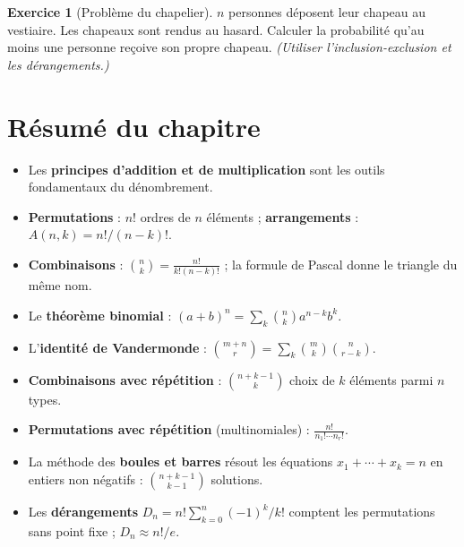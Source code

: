 \documentclass[12pt,a4paper,openany]{book}
\theoremstyle{definition}
\newtheorem{exercice}{Exercice}[chapter]
\theoremstyle{plain}
\theoremstyle{remark}
\begin{document}
\begin{exercice}[Problème du chapelier]\label{exo:chapelier}
$n$ personnes déposent leur chapeau au vestiaire. Les chapeaux sont rendus
au hasard. Calculer la probabilité qu'au moins une personne reçoive son propre
chapeau. \textit{(Utiliser l'inclusion-exclusion et les dérangements.)}
\end{exercice}

\section*{Résumé du chapitre~\thechapter}\label{sec:resume-ch4}

\begin{itemize}
  \item Les \textbf{principes d'addition et de multiplication} sont les outils
    fondamentaux du dénombrement.
  \item \textbf{Permutations} : $n!$ ordres de $n$ éléments ;
    \textbf{arrangements} : $A(n,k) = n!/(n-k)!$.
  \item \textbf{Combinaisons} : $\binom{n}{k} = \frac{n!}{k!(n-k)!}$ ; la
    formule de Pascal donne le triangle du même nom.
  \item Le \textbf{théorème binomial} :
    $(a+b)^n = \sum_{k}\binom{n}{k}a^{n-k}b^k$.
  \item L'\textbf{identité de Vandermonde} :
    $\binom{m+n}{r} = \sum_k \binom{m}{k}\binom{n}{r-k}$.
  \item \textbf{Combinaisons avec répétition} :
    $\binom{n+k-1}{k}$ choix de $k$ éléments parmi $n$ types.
  \item \textbf{Permutations avec répétition} (multinomiales) :
    $\frac{n!}{n_1!\cdots n_r!}$.
  \item La méthode des \textbf{boules et barres} résout les équations
    $x_1 + \cdots + x_k = n$ en entiers non négatifs :
    $\binom{n+k-1}{k-1}$ solutions.
  \item Les \textbf{dérangements} $D_n = n!\sum_{k=0}^{n}(-1)^k/k!$
    comptent les permutations sans point fixe ; $D_n \approx n!/e$.
\end{itemize}


\end{document}
